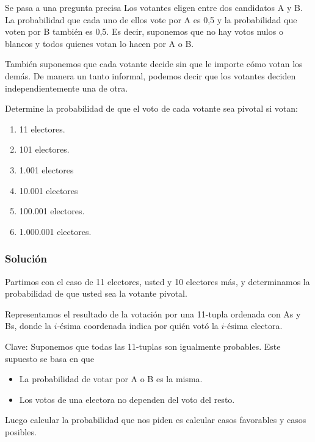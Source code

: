 \documentclass[9pt,handout]{beamer}
\begin{document}

\begin{frame}{Se pasa a una pregunta precisa}
Los votantes eligen entre dos candidatos A y B. 
                   La probabilidad que cada uno de ellos
                   vote por A es 0,5 y la probabilidad
                   que voten por B también es 0,5. 
                   Es decir, suponemos que no hay votos nulos o blancos y
                   todos quienes votan lo hacen por A o B.
                   
                   \bigskip
                   
                   También suponemos que 
                   cada votante decide sin que 
                   le importe cómo votan los demás. 
De manera un tanto
                   informal, podemos decir que los votantes
                   deciden independientemente una de otra. 

\bigskip
          
          Determine la probabilidad de que el voto
          de cada votante sea pivotal si votan:
          \begin{enumerate}
          \item 11 electores. 
          \item 101 electores. 
          \item 1.001 electores
          \item 10.001 electores
          \item 100.001 electores.
          \item 1.000.001 electores. 
          \end{enumerate}
\end{frame}

\begin{frame}
\frametitle{Solución}

Partimos con el caso de 11 electores,  
usted y 10 electores más, y determinamos
la probabilidad de que usted sea la votante pivotal.

\bigskip

Representamos el resultado de la votación
por una 11-tupla ordenada con As y Bs, 
donde la $i$-ésima coordenada indica
por quién votó la $i$-ésima electora. 

\bigskip

Clave: Suponemos que todas las 11-tuplas son igualmente
probables. Este supuesto se basa en que

\begin{itemize}
\item La probabilidad de votar por A o B es la misma.
\item Los votos de una electora no dependen del voto del resto.
\end{itemize}

\bigskip

Luego calcular la probabilidad que nos piden
es calcular casos favorables y casos posibles. 
\end{frame}
\end{document}
